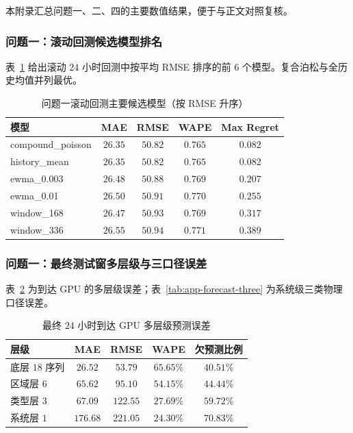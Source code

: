 \documentclass[UTF8,a4paper,zihao=-4]{ctexart}
\begin{document}
本附录汇总问题一、二、四的主要数值结果，便于与正文对照复核。

\subsubsection{问题一：滚动回测候选模型排名}

表~\ref{tab:app-q1-backtest} 给出滚动 $24$ 小时回测中按平均 RMSE 排序的前 6 个模型。复合泊松与全历史均值并列最优。

\begin{table}[H]
\centering
\small
\caption{问题一滚动回测主要候选模型（按 RMSE 升序）}
\label{tab:app-q1-backtest}
\begin{tabular}{lcccc}
\toprule
模型 & MAE & RMSE & WAPE & Max Regret \\
\midrule
compound\_poisson & $26.35$ & $50.82$ & $0.765$ & $0.082$ \\
history\_mean & $26.35$ & $50.82$ & $0.765$ & $0.082$ \\
ewma\_0.003 & $26.48$ & $50.88$ & $0.769$ & $0.207$ \\
ewma\_0.01 & $26.50$ & $50.91$ & $0.770$ & $0.255$ \\
window\_168 & $26.47$ & $50.93$ & $0.769$ & $0.317$ \\
window\_336 & $26.55$ & $50.94$ & $0.771$ & $0.389$ \\
\bottomrule
\end{tabular}
\end{table}

\subsubsection{问题一：最终测试窗多层级与三口径误差}

表~\ref{tab:app-q1-multilevel} 为到达 GPU 的多层级误差；表~\ref{tab:app-forecast-three} 为系统级三类物理口径误差。

\begin{table}[H]
\centering
\small
\caption{最终 $24$ 小时到达 GPU 多层级预测误差}
\label{tab:app-q1-multilevel}
\begin{tabular}{lcccc}
\toprule
层级 & MAE & RMSE & WAPE & 欠预测比例 \\
\midrule
底层 $18$ 序列 & $26.52$ & $53.79$ & $65.65\%$ & $40.51\%$ \\
区域层 $6$ & $65.62$ & $95.10$ & $54.15\%$ & $44.44\%$ \\
类型层 $3$ & $67.09$ & $122.55$ & $27.69\%$ & $59.72\%$ \\
系统层 $1$ & $176.68$ & $221.05$ & $24.30\%$ & $70.83\%$ \\
\bottomrule
\end{tabular}
\end{table}
\end{document}

